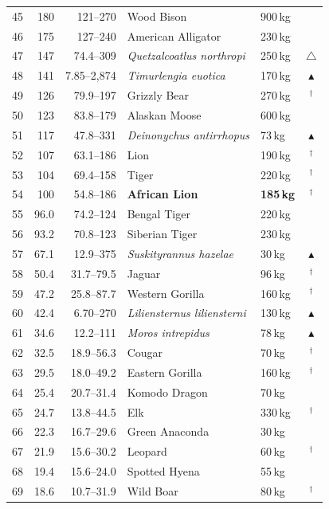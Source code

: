 \documentclass[11pt]{article}
\begin{document}
\begin{longtable}{rrrllc}
45 & 180 & 121--270 & Wood Bison & 900\,kg &  \\
46 & 175 & 127--240 & American Alligator & 230\,kg &  \\
47 & 147 & 74.4--309 & \textit{Quetzalcoatlus northropi} & 250\,kg & $\triangle$ \\
48 & 141 & 7.85--2,874 & \textit{Timurlengia euotica} & 170\,kg & $\blacktriangle$ \\
49 & 126 & 79.9--197 & Grizzly Bear & 270\,kg & $^{\dagger}$ \\
50 & 123 & 83.8--179 & Alaskan Moose & 600\,kg &  \\
51 & 117 & 47.8--331 & \textit{Deinonychus antirrhopus} & 73\,kg & $\blacktriangle$ \\
52 & 107 & 63.1--186 & Lion & 190\,kg & $^{\dagger}$ \\
53 & 104 & 69.4--158 & Tiger & 220\,kg & $^{\dagger}$ \\
54 & 100 & 54.8--186 & \textbf{African Lion} & \textbf{185\,kg} & $^{\dagger}$ \\
55 & 96.0 & 74.2--124 & Bengal Tiger & 220\,kg &  \\
56 & 93.2 & 70.8--123 & Siberian Tiger & 230\,kg &  \\
57 & 67.1 & 12.9--375 & \textit{Suskityrannus hazelae} & 30\,kg & $\blacktriangle$ \\
58 & 50.4 & 31.7--79.5 & Jaguar & 96\,kg & $^{\dagger}$ \\
59 & 47.2 & 25.8--87.7 & Western Gorilla & 160\,kg & $^{\dagger}$ \\
60 & 42.4 & 6.70--270 & \textit{Liliensternus liliensterni} & 130\,kg & $\blacktriangle$ \\
61 & 34.6 & 12.2--111 & \textit{Moros intrepidus} & 78\,kg & $\blacktriangle$ \\
62 & 32.5 & 18.9--56.3 & Cougar & 70\,kg & $^{\dagger}$ \\
63 & 29.5 & 18.0--49.2 & Eastern Gorilla & 160\,kg & $^{\dagger}$ \\
64 & 25.4 & 20.7--31.4 & Komodo Dragon & 70\,kg &  \\
65 & 24.7 & 13.8--44.5 & Elk & 330\,kg & $^{\dagger}$ \\
66 & 22.3 & 16.7--29.6 & Green Anaconda & 30\,kg &  \\
67 & 21.9 & 15.6--30.2 & Leopard & 60\,kg & $^{\dagger}$ \\
68 & 19.4 & 15.6--24.0 & Spotted Hyena & 55\,kg &  \\
69 & 18.6 & 10.7--31.9 & Wild Boar & 80\,kg & $^{\dagger}$ \\

\end{longtable}
\end{document}
